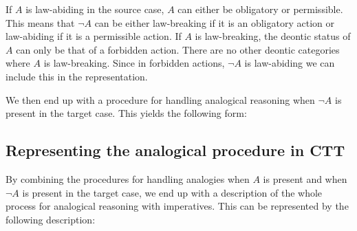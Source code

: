 		If $A$ is law-abiding in the source case, $A$ can either be obligatory or permissible. This means that $\neg A$ can be either law-breaking if it is an obligatory action or law-abiding if it is a permissible action. If $A$ is law-breaking, the deontic status of $A$ can only be that of a forbidden action. There are no other deontic categories where $A$ is law-breaking. Since in forbidden actions, $\neg A$ is law-abiding we can include this in the representation.
		
		We then end up with a procedure for handling analogical reasoning when $\neg A$ is present in the target case. This yields the following form:\medskip
			
			\noindent\begin{minipage}{0.9\textwidth}
			\end{minipage}\medskip				
		
	\subsection{Representing the analogical procedure in CTT}
		
		By combining the procedures for handling analogies when $A$ is present and when $\neg A$ is present in the target case, we end up with a description of the whole process for analogical reasoning with imperatives. This can be represented by the following description:\medskip
		
